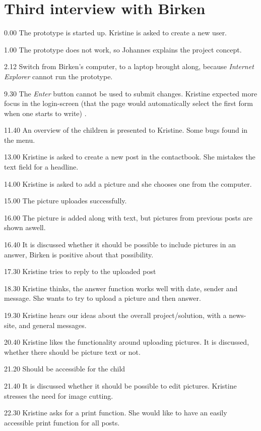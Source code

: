 \section{Third interview with Birken}
\label{third_interview}

0.00
The prototype is started up.
Kristine is asked to create a new user.

1.00
The prototype does not work, so Johannes explains the project concept.

2.12
Switch from Birken's computer, to a laptop brought along, because \emph{Internet Explorer} cannot run the prototype.

9.30
The \emph{Enter} button cannot be used to submit changes. Kristine expected more focus in the login-screen (that the page would automatically select the first form when one starts to write) .

11.40
An overview of the children is presented to Kristine.
Some bugs found in the menu.

13.00
Kristine is asked to create a new post in the contactbook. She mistakes the text field for a headline.

14.00
Kristine is asked to add a picture and she chooses one from the computer.

15.00
The picture uploades successfully.

16.00
The picture is added along with text, but pictures from previous posts are shown aswell.

16.40
It is discussed whether it should be possible to include pictures in an answer, Birken is positive about that possibility.

17.30
Kristine tries to reply to the uploaded post

18.30
Kristine thinks, the answer function works well with date, sender and message. She wants to try to upload a picture and then answer.

19.30
Kristine hears our ideas about the overall project/solution, with a news-site, and general messages.

20.40
Kristine likes the functionality around uploading pictures.
It is discussed, whether there should be picture text or not.

21.20
Should be accessible for the child

21.40
It is discussed whether it should be possible to edit pictures. Kristine stresses the need for image cutting.

22.30
Kristine asks for a print function. She would like to have an easily accessible print function for all posts.

